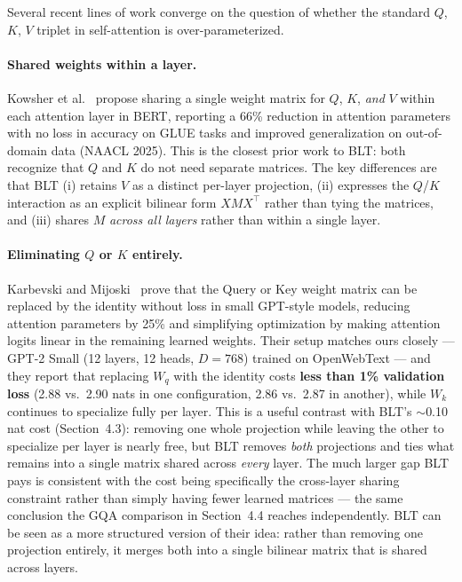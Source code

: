 \documentclass[11pt]{article}
\begin{document}
Several recent lines of work converge on the question of whether the standard $Q$, $K$, $V$ triplet in self-attention is over-parameterized.

\paragraph{Shared weights within a layer.} Kowsher et al.~\cite{kowsher2025shared} propose sharing a single weight matrix for $Q$, $K$, \emph{and} $V$ within each attention layer in BERT, reporting a 66\% reduction in attention parameters with no loss in accuracy on GLUE tasks and improved generalization on out-of-domain data (NAACL 2025). This is the closest prior work to BLT: both recognize that $Q$ and $K$ do not need separate matrices. The key differences are that BLT (i) retains $V$ as a distinct per-layer projection, (ii) expresses the $Q$/$K$ interaction as an explicit bilinear form $XMX^\top$ rather than tying the matrices, and (iii) shares $M$ \emph{across all layers} rather than within a single layer.

\paragraph{Eliminating $Q$ or $K$ entirely.} Karbevski and Mijoski~\cite{karbevski2025identity} prove that the Query or Key weight matrix can be replaced by the identity without loss in small GPT-style models, reducing attention parameters by 25\% and simplifying optimization by making attention logits linear in the remaining learned weights. Their setup matches ours closely --- GPT-2 Small (12 layers, 12 heads, $D=768$) trained on OpenWebText --- and they report that replacing $W_q$ with the identity costs \textbf{less than 1\% validation loss} (2.88 vs.\ 2.90 nats in one configuration, 2.86 vs.\ 2.87 in another), while $W_k$ continues to specialize fully per layer. This is a useful contrast with BLT's $\sim$0.10 nat cost (Section~4.3): removing one whole projection while leaving the other to specialize per layer is nearly free, but BLT removes \emph{both} projections and ties what remains into a single matrix shared across \emph{every} layer. The much larger gap BLT pays is consistent with the cost being specifically the cross-layer sharing constraint rather than simply having fewer learned matrices --- the same conclusion the GQA comparison in Section~4.4 reaches independently. BLT can be seen as a more structured version of their idea: rather than removing one projection entirely, it merges both into a single bilinear matrix that is shared across layers.
\end{document}
